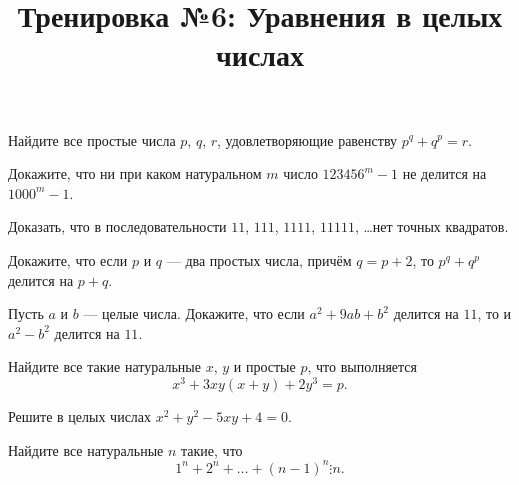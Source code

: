 



\title{Тренировка №6: Уравнения в целых числах}
\maketitle

\begin{problem}
	Найдите все простые числа $p$, $q$, $r$, удовлетворяющие равенству $p^q + q^p = r$.
\end{problem}

\begin{problem}
	Докажите, что ни при каком натуральном $m$ число $123456^m - 1$ не делится на $1000^m - 1$.
\end{problem}

\begin{problem}
	Доказать, что в последовательности $11$, $111$, $1111$, $11111$, \dots нет точных квадратов.
\end{problem}

\begin{problem}
	Докажите, что если $p$ и $q$ --- два простых числа, причём $q = p + 2$, то $p^q + q^p$ делится на $p + q$.
\end{problem}

\begin{problem}
	Пусть $a$ и $b$ --- целые числа. Докажите, что если $a^2 + 9ab + b^2$ делится на $11$, то и $a^2 - b^2$ делится на $11$.
\end{problem}

\begin{problem}
	Найдите все такие натуральные $x$, $y$ и простые $p$, что выполняется
\begin{equation}
  x^3 + 3xy(x + y) + 2y^3 = p.
\end{equation}
\end{problem}

\begin{problem}
	Решите в целых числах $x^2 + y^2 - 5xy + 4 = 0$.
\end{problem}

\begin{problem}
	Найдите все натуральные $n$ такие, что
\begin{equation}
  1^n + 2^n + \ldots + (n - 1)^n \vdots n.
\end{equation}
\end{problem}

